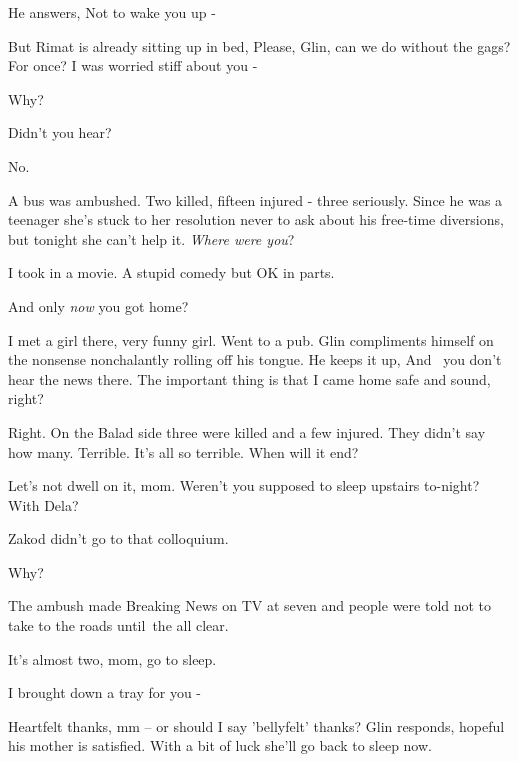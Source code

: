 \documentclass[12pt]{book}
\begin{document}
He answers, {\textquotedbl}Not to wake you up -{\textquotedbl}

But Rimat is already sitting up in bed, {\textquotedbl}Please, Glin, can we do without the gags? For once? I was worried
stiff about you -{\textquotedbl}

{\textquotedbl}Why?{\textquotedbl}

{\textquotedbl}Didn't you hear?{\textquotedbl}

{\textquotedbl}No.{\textquotedbl}

{\textquotedbl}A bus was ambushed. Two killed, fifteen injured - three seriously.{\textquotedbl} Since he was a teenager
she's stuck to her resolution never{ }to ask about his
free{{}-}time diversions, but tonight she can't help it.
{\textquotedbl}\textit{Where were you}?{\textquotedbl}

{\textquotedbl}I took in a movie. A stupid{ }comedy but OK in
parts.{\textquotedbl}

{\textquotedbl}And only \textit{now} you got home?{\textquotedbl} ~

{\textquotedbl}I met a girl there, very funny girl. Went to a pub.{\textquotedbl} Glin compliments himself on the
nonsense nonchalantly rolling off his tongue. He keeps it up, {\textquotedbl}And \ you don't hear the news there. The
important thing is that I came home safe and sound, right?{\textquotedbl}

{\textquotedbl}Right. On the Balad side three were killed and a few injured. They didn't say how many. Terrible. It's
all so terrible. When will it end?{\textquotedbl}

{\textquotedbl}Let's not dwell on it, mom. Weren't you supposed to sleep upstairs to-night? With Dela?{\textquotedbl}

{\textquotedbl}Zakod didn't go to that colloquium.{\textquotedbl}

{\textquotedbl}Why?{\textquotedbl}

{\textquotedbl}The ambush made Breaking News on TV at seven and people were told not to take to the roads until~the all
clear.{\textquotedbl}

{\textquotedbl}It's almost two, mom, go to sleep.{\textquotedbl}

{\textquotedbl}I brought down a tray for you -{\textquotedbl}

{\textquotedbl}Heartfelt thanks, mm -- or should I say 'bellyfelt' thanks?{\textquotedbl} Glin responds, hopeful his
mother is satisfied. With a bit of luck she'll go back to sleep now.
\end{document}
